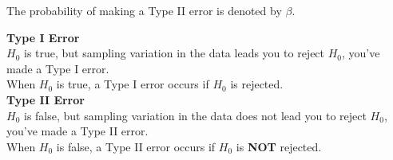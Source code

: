 The probability of making a Type II error is denoted by $\beta$. 
\begin{tcolorbox}[title=\textbf{Decision Errors in Tests},
  colback=yellow!10,
  colframe=black!45,
  coltitle=black,
  fonttitle=\bfseries,
  breakable]

\textbf{Type I Error} \\
$H_0$ is true, but sampling variation in the data leads you to reject $H_0$, you’ve made a Type I error. \\
When $H_0$ is true, a Type I error occurs if $H_0$ is rejected. \\

\textbf{Type II Error} \\
$H_0$ is false, but sampling variation in the data does not lead you to reject $H_0$, you’ve made a Type II error. \\
When $H_0$ is false, a Type II error occurs if $H_0$ is \textbf{NOT} rejected.

\end{tcolorbox}

